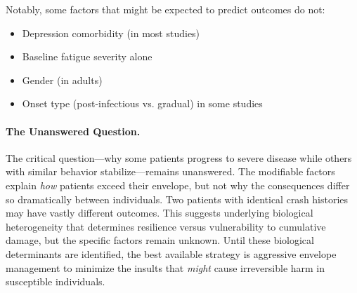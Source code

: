 Notably, some factors that might be expected to predict outcomes do not:
\begin{itemize}
    \item Depression comorbidity (in most studies)
    \item Baseline fatigue severity alone
    \item Gender (in adults)
    \item Onset type (post-infectious vs. gradual) in some studies
\end{itemize}

\paragraph{The Unanswered Question.}

The critical question---why some patients progress to severe disease while others with similar behavior stabilize---remains unanswered. The modifiable factors explain \emph{how} patients exceed their envelope, but not why the consequences differ so dramatically between individuals. Two patients with identical crash histories may have vastly different outcomes. This suggests underlying biological heterogeneity that determines resilience versus vulnerability to cumulative damage, but the specific factors remain unknown. Until these biological determinants are identified, the best available strategy is aggressive envelope management to minimize the insults that \emph{might} cause irreversible harm in susceptible individuals.

